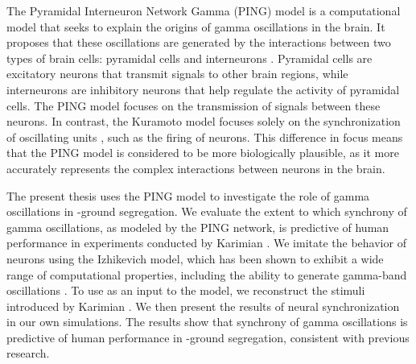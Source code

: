 The Pyramidal Interneuron Network Gamma (PING) model is a computational model that seeks to explain the origins of gamma oscillations in the brain. It proposes that these oscillations are generated by the interactions between two types of brain cells: pyramidal cells and interneurons \cite{Wilson1972, Whittington2000, Hansel2003}. Pyramidal cells are excitatory neurons that transmit signals to other brain regions, while interneurons are inhibitory neurons that help regulate the activity of pyramidal cells. The PING model focuses on the transmission of signals between these neurons. In contrast, the Kuramoto model focuses solely on the synchronization of oscillating units \cite{Breakspear2010}, such as the firing of neurons. This difference in focus means that the PING model is considered to be more biologically plausible, as it more accurately represents the complex interactions between neurons in the brain.

The present thesis uses the PING model to investigate the role of gamma oscillations in \stimfig-ground segregation. We evaluate the extent to which synchrony of gamma oscillations, as modeled by the PING network, is predictive of human performance in experiments conducted by Karimian \cite{MaryamPLACEHOLDER}. 
We imitate the behavior of neurons using the Izhikevich model, which has been shown to exhibit a wide range of computational properties, including the ability to generate gamma-band oscillations \cite{Izhikevich2003}. To use as an input to the model, we reconstruct the stimuli introduced by Karimian \cite{MaryamPLACEHOLDER}. We then present the results of neural synchronization in our own simulations. The results show that synchrony of gamma oscillations is predictive of human performance in \stimfig-ground segregation, consistent with previous research.




